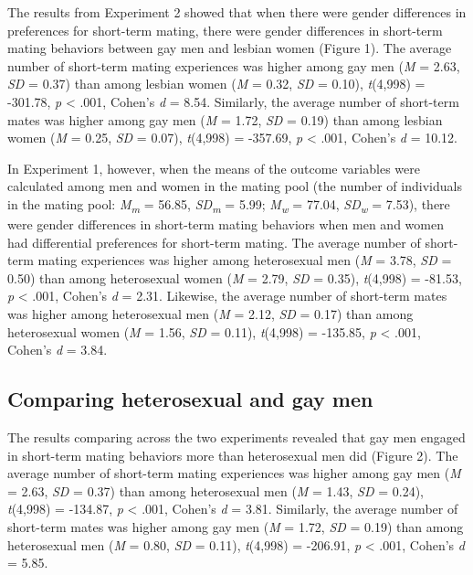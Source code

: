 \documentclass[
  11pt,
]{article}
\begin{document}
The results from Experiment 2 showed that when there were gender
differences in preferences for short-term mating, there were gender
differences in short-term mating behaviors between gay men and lesbian
women (Figure 1). The average number of short-term mating experiences
was higher among gay men (\emph{M} = 2.63, \emph{SD} = 0.37) than among
lesbian women (\emph{M} = 0.32, \emph{SD} = 0.10), \emph{t}(4,998) =
-301.78, \emph{p} \textless{} .001, Cohen's \emph{d} = 8.54. Similarly,
the average number of short-term mates was higher among gay men
(\emph{M} = 1.72, \emph{SD} = 0.19) than among lesbian women (\emph{M} =
0.25, \emph{SD} = 0.07), \emph{t}(4,998) = -357.69, \emph{p} \textless{}
.001, Cohen's \emph{d} = 10.12.

In Experiment 1, however, when the means of the outcome variables were
calculated among men and women in the mating pool (the number of
individuals in the mating pool: \emph{M\textsubscript{m}} = 56.85,
\emph{SD\textsubscript{m}} = 5.99; \emph{M\textsubscript{w}} = 77.04,
\emph{SD\textsubscript{w}} = 7.53), there were gender differences in
short-term mating behaviors when men and women had differential
preferences for short-term mating. The average number of short-term
mating experiences was higher among heterosexual men (\emph{M} = 3.78,
\emph{SD} = 0.50) than among heterosexual women (\emph{M} = 2.79,
\emph{SD} = 0.35), \emph{t}(4,998) = -81.53, \emph{p} \textless{} .001,
Cohen's \emph{d} = 2.31. Likewise, the average number of short-term
mates was higher among heterosexual men (\emph{M} = 2.12, \emph{SD} =
0.17) than among heterosexual women (\emph{M} = 1.56, \emph{SD} = 0.11),
\emph{t}(4,998) = -135.85, \emph{p} \textless{} .001, Cohen's \emph{d} =
3.84.

\hypertarget{comparing-heterosexual-and-gay-men}{%
\subsection{Comparing heterosexual and gay
men}\label{comparing-heterosexual-and-gay-men}}

The results comparing across the two experiments revealed that gay men
engaged in short-term mating behaviors more than heterosexual men did
(Figure 2). The average number of short-term mating experiences was
higher among gay men (\emph{M} = 2.63, \emph{SD} = 0.37) than among
heterosexual men (\emph{M} = 1.43, \emph{SD} = 0.24), \emph{t}(4,998) =
-134.87, \emph{p} \textless{} .001, Cohen's \emph{d} = 3.81. Similarly,
the average number of short-term mates was higher among gay men
(\emph{M} = 1.72, \emph{SD} = 0.19) than among heterosexual men
(\emph{M} = 0.80, \emph{SD} = 0.11), \emph{t}(4,998) = -206.91, \emph{p}
\textless{} .001, Cohen's \emph{d} = 5.85.
\end{document}

